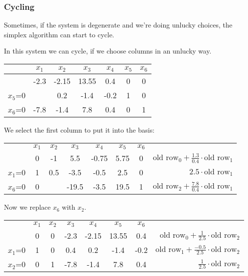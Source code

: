 \subsubsection*{Cycling}

Sometimes, if the system is degenerate and we're doing unlucky choices, the simplex algorithm can start to cycle.

\begin{Ex}[Cycling]\label{Ex:cycling} In this system we can cycle, if we choose columns in an unlucky way.
\begin{center}
\begin{tabular}{c|cccccc}
    & $x_1$ & $x_2$ & $x_3$ & $x_4$ & $x_5$ & $x_6$\\\hline
    & -2.3 & -2.15 & 13.55 & 0.4 & 0 & 0\\\hline
$x_5$=0 & \cellcolor{gruen}{\bf 0.4} & 0.2 & -1.4 & -0.2 & 1 & 0 \\
$x_6$=0 & -7.8 & -1.4 & 7.8 & 0.4 & 0 & 1\\
\end{tabular}
\end{center}

We select the first column to put it into the basis:

\begin{center}
\begin{tabular}{c|ccccccr}
    & $x_1$ & $x_2$ & $x_3$ & $x_4$ & $x_5$ & $x_6$\\\cline{1-7}
    & 0 & -1 & 5.5 & -0.75 & 5.75 & 0&\hspace{1cm} $\text{old row}_0 + \frac{1.3}{0.4}\cdot \text{old row}_1$\\\cline{1-7}
$x_1$=0 & 1 & 0.5 & -3.5 & -0.5 & 2.5 & 0 &\hspace{1cm} $2.5 \cdot \text{old row}_1$\\
$x_6$=0 & 0 & \cellcolor{gruen}{\bf 2.5} & -19.5 & -3.5 & 19.5 & 1&\hspace{1cm} $\text{old row}_2 + \frac{7.8}{0.4}\cdot \text{old row}_1$\\
\end{tabular}
\end{center}

Now we replace $x_6$ with $x_2$.

\begin{center}
\begin{tabular}{c|ccccccr}
    & $x_1$ & $x_2$ & $x_3$ & $x_4$ & $x_5$ & $x_6$\\\cline{1-7}
    & 0 & 0 & -2.3 & -2.15 & 13.55 & 0.4&\hspace{1cm} $\text{old row}_0 + \frac{1}{2.5}\cdot \text{old row}_2$\\\cline{1-7}
$x_1$=0 & 1 & 0 & 0.4 & 0.2 & -1.4 & -0.2&\hspace{1cm} $\text{old row}_1 + \frac{-0.5}{2.5}\cdot \text{old row}_2$ \\
$x_2$=0 & 0 & 1 & -7.8 & -1.4 & 7.8 & 0.4&\hspace{1cm} $\frac{1}{2.5} \cdot \text{old row}_2$\\
\end{tabular}
\end{center}


\end{Ex}
